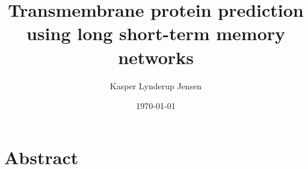 \documentclass{article}
\title{Transmembrane protein prediction using long short-term memory networks}
\author{Kasper Lynderup Jensen}
\date{\today}
\begin{document}
\maketitle

\section*{Abstract}

\tableofcontents

















\printbibliography
\end{document}
